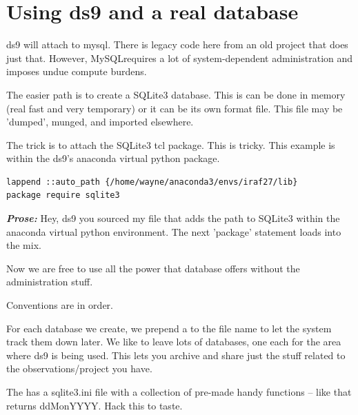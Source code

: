 
\renewcommand{\footerfilename}{ds9sql.tex}

\section{Using ds9 and a real database}

ds9 will attach to mysql. There is legacy code here from an old project
that does just that. However, MySQL\texttrademark requires a lot of
system-dependent administration and imposes undue compute burdens.

The easier path is to create a SQLite3 database. This is can be done
in memory (real fast and very temporary) or it can be its own format
file. This file may be 'dumped', munged, and imported elsewhere.

The trick is to attach the SQLite3 tcl package. This is tricky.
This example is within the ds9's anaconda virtual python package.

\begingroup \fontsize{10pt}{10pt}
\selectfont
\begin{verbatim} 
lappend ::auto_path {/home/wayne/anaconda3/envs/iraf27/lib}
package require sqlite3
\end{verbatim}
\endgroup

\textbf{\emph{Prose:}} Hey, ds9 you sourced my file that adds the path
to SQLite3 within the anaconda  virtual python
environment. The next 'package' statement loads  into the
mix.

Now we are free to use all the power that database offers without
the administration stuff.

Conventions are in order.

For each database we create, we prepend a  to the file
name to let the system track them down later. We like to leave
lots of databases, one each for the area where ds9 is being used.
This lets you archive and share just the stuff related to the
observations/project you have.

The  has a sqlite3.ini file with a collection of
pre-made handy functions -- like  that returns ddMonYYYY.
Hack this to taste.
